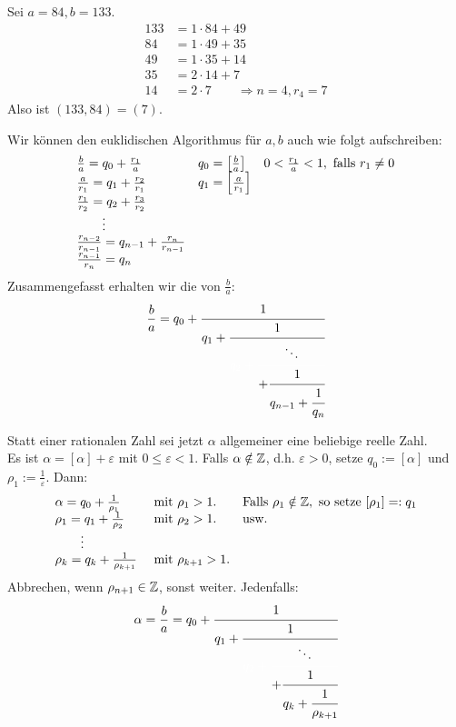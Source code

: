 	Sei $a = 84, b=133$.
	\begin{equation}
	\begin{aligned}
		133 &= 1 \cdot 84 + 49 \\
		84 &= 1 \cdot 49 + 35 \\
		49 &= 1 \cdot 35 + 14 \\
		35 &= 2 \cdot 14 + 7 \\
		14 &= 2 \cdot 7	\qquad \Rightarrow n=4, r_4 = 7
	\end{aligned}
	\end{equation}
	Also ist $(133,84) = (7)$.

Wir können den euklidischen Algorithmus für $a,b$ auch wie folgt aufschreiben:
	\[\begin{array}{lll}
	\frac{b}{a} = q_0 + \frac{r_1}{a} & q_0 = \benbrace*{\frac{b}{a}} & 0 < \frac{r_1}{a} < 1, \text{ falls } r_1 \neq 0 \\ 
	\frac{a}{r_1} = q_1 + \frac{r_2}{r_1} & q_1 = \benbrace*{\frac{a}{r_1}} &  \\ 
	\frac{r_1}{r_2} = q_2 + \frac{r_3}{r_2} & &  \\ 
	\qquad \vdots &  &  \\ 
	\frac{r_{n-2}}{r_{n-1}} = q_{n-1} + \frac{r_n}{r_{n-1}} & &  \\ 
	\frac{r_{n-1}}{r_n} = q_n &  & 
	\end{array} \]
Zusammengefasst erhalten wir die  von $\frac{b}{a}$:
	\[ \frac{b}{a} = q_0 + \cfrac{1}{q_1 + \cfrac{1}{\textcolor{white}{q_2 + \cfrac{\textcolor{black}{\ddots}}{\textcolor{black}{+\cfrac{1}{q_{n-1}+\cfrac{1}{q_n}}}}}}} \]
	
Statt einer rationalen Zahl sei jetzt $\alpha$ allgemeiner eine beliebige reelle Zahl. \\
Es ist $\alpha = [\alpha] + \varepsilon$ mit $0 \leq \varepsilon < 1$. Falls $\alpha \notin \ZZ$, d.h. $\varepsilon > 0$, setze $q_0 := [\alpha]$ und $\rho_1 := \frac{1}{\varepsilon}$. Dann:
\[ \begin{array}{lll}
\alpha = q_0 + \frac{1}{\rho_1} & \text{ mit } \rho_1 > 1. & \text{Falls } \rho_1 \notin \ZZ, \text{ so setze } [\rho_1] =: q_1 \\ 
\rho_1 = q_1 + \frac{1}{\rho_2} & \text{ mit } \rho_2 > 1. & \text{usw.} \\ 
\qquad \vdots &  &  \\ 
\rho_k = q_k + \frac{1}{\rho_{k+1}} & \text{ mit } \rho_{k+1} > 1.  & 
\end{array} \]
Abbrechen, wenn $\rho_{n+1} \in \ZZ$, sonst weiter. Jedenfalls:
\[ \alpha = \frac{b}{a} = q_0 + \cfrac{1}{q_1 + \cfrac{1}{\textcolor{white}{q_2 + \cfrac{\textcolor{black}{\ddots}}{\textcolor{black}{+\cfrac{1}{q_k+\cfrac{1}{\rho_{k+1}}}}}}}} \]

